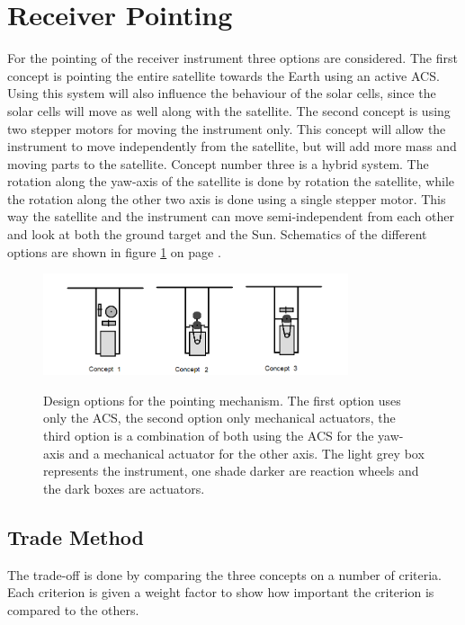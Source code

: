 \section{Receiver Pointing}
For the pointing of the receiver instrument three options are considered. The first concept is pointing the entire satellite towards the Earth using an active \ac{ACS}. Using this system will also influence the behaviour of the solar cells, since the solar cells will move as well along with the satellite. The second concept is using two stepper motors for moving the instrument only. This concept will allow the instrument to move independently from the satellite, but will add more mass and moving parts to the satellite. Concept number three is a hybrid system. The rotation along the yaw-axis of the satellite is done by rotation the satellite, while the rotation along the other two axis is done using a single stepper motor. This way the satellite and the instrument can move semi-independent from each other and look at both the ground target and the Sun. Schematics of the different options are shown in figure \ref{fig:pointeroptions} on page \pageref{fig:pointeroptions}.

\begin{figure}[h]
\centering
\includegraphics[width=0.8\textwidth]{chapters/img/pointingsystemoptions.png} 
\label{fig:pointeroptions}
\caption[Design options for the pointing mechanism]{Design options for the pointing mechanism. The first option uses only the \ac{ACS}, the second option only mechanical actuators, the third option is a combination of both using the \ac{ACS} for the yaw-axis and a mechanical actuator for the other axis. The light grey box represents the instrument, one shade darker are reaction wheels and the dark boxes are actuators.}
\end{figure}

\subsection{Trade Method}
The trade-off is done by comparing the three concepts on a number of criteria. Each criterion is given a weight factor to show how important the criterion is compared to the others.

